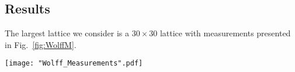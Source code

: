 \documentclass[twocolumn,aps,prl]{revtex4-1} %
\begin{document}
%


\subsection{Results}
The largest lattice we consider is a $30 \times 30$ lattice with measurements presented in Fig.~\ref{fig:WolffM}.
\begin{figure*}
	\texttt{[image: "Wolff\_Measurements".pdf]}
	\caption{\label{fig:WolffM}Plots showing the mean energy per spin, specific heat per spin, mean (absolute) magnetization per spin, magnetic susceptibility on a 30 $\times$ 30 lattice from $T = 1.6$ to $T = 2.9$ in increments of $\Delta T = .01$. 
		The equilibration time at each temperature is 30 steps and each data point is obtained from 150 measurements. The error bars computed using the bootstrap method are too small to see.}
\end{figure*}
\end{document}
